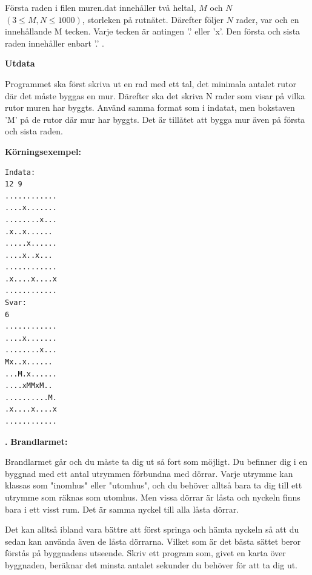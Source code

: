 \documentclass[a4paper,12pt]{article}
\newcounter{iii}\setcounter{iii}{0}
\def\i{\bigskip\noindent\refstepcounter{iii}\textbf{\arabic{iii}.} }
\begin{document}
Första raden i filen muren.dat innehåller två heltal, $M$ och $N$ $(3 ≤ M,N ≤ 1000)$, storleken på rutnätet. Därefter följer $N$ rader, var och en innehållande M tecken. Varje tecken är antingen ’.’ eller ’x’. Den första och sista raden innehåller enbart ’.’ .

\textbf{Utdata}

Programmet ska först skriva ut en rad med ett tal, det minimala antalet rutor där det måste byggas en mur. Därefter ska det skriva N rader som visar på vilka rutor muren har byggts. Använd samma format som i indatat, men bokstaven ’M’ på de rutor där mur har byggts. Det är tillåtet att bygga mur även på första och sista raden. 


\textbf{Körningsexempel:}

\begin{lstlisting}
Indata:
12 9
............
....x.......
........x...
.x..x......
.....x......
....x..x...
............
.x....x....x
............
Svar:
6
............
....x.......
........x...
Mx..x......
...M.x......
....xMMxM..
..........M.
.x....x....x
............
\end{lstlisting}



\i \textbf{Brandlarmet:}

Brandlarmet går och du måste ta dig ut så fort som möjligt. Du befinner dig i en byggnad med ett antal utrymmen förbundna med dörrar. Varje utrymme kan klassas som "inomhus" eller "utomhus", och du behöver alltså bara ta dig till ett utrymme som räknas som utomhus. Men vissa dörrar är låsta och nyckeln finns bara i ett visst rum. Det är samma nyckel till alla låsta dörrar.

Det kan alltså ibland vara bättre att först springa och hämta nyckeln så att du sedan kan använda även de låsta dörrarna. Vilket som är det bästa sättet beror förstås på byggnadens utseende. Skriv ett program som, givet en karta över byggnaden, beräknar det minsta antalet sekunder du behöver för att ta dig ut.
\end{document}
